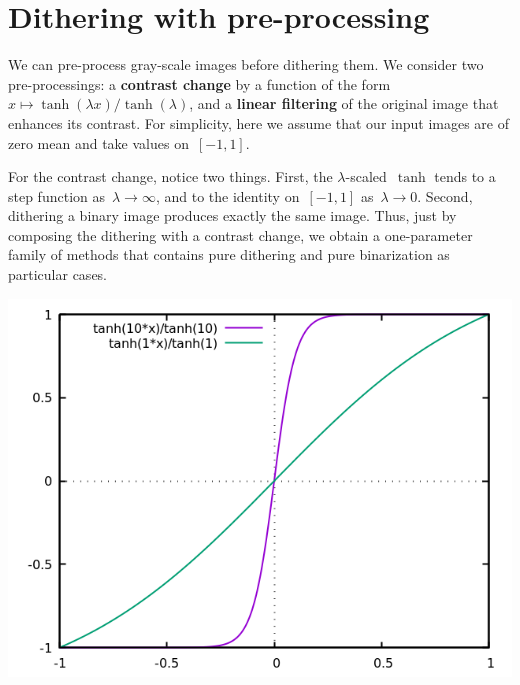 
\section{Dithering with pre-processing}

We can pre-process gray-scale images before dithering them.  We consider two
pre-processings: a {\bf contrast change} by a function of the
form~$x\mapsto\tanh(\lambda x)/\tanh(\lambda)$, and a {\bf linear filtering}
of the original image that enhances its contrast.  For simplicity, here we
assume that our input images are of zero mean and take values on~$[-1,1]$.

For the contrast change, notice two things.  First, the
$\lambda$-scaled~$\tanh$ tends to a step function as~$\lambda\to\infty$, and
to the identity on~$[-1,1]$ as~$\lambda\to0$.
Second, dithering a binary image produces exactly the same image.  Thus, just
by composing the dithering with a contrast change, we obtain a one-parameter
family of methods that contains pure dithering and pure
binarization as particular cases.

\includegraphics{tanhs.png}


